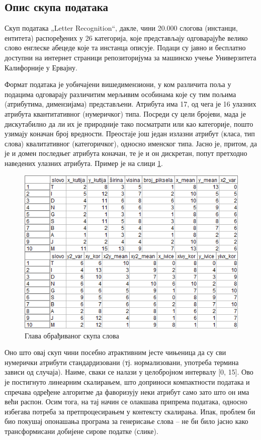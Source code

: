 \documentclass[a4paper]{article}
\begin{document}
\subsection{Опис скупа података}

Скуп података „Letter Recognition“, дакле, чини 20.000 слогова (инстанци, ентитета) распоређених у 26 категорија, које представљају одговарајуће велико слово енглеске абецеде које та инстанца описује. Подаци су јавно и бесплатно доступни на интернет страници репозиторијума за машинско учење Универзитета Калифорније у Ервајну.\cite{data}

Формат података је уобичајени вишедимензиони, у ком различита поља у подацима одговарају различитим мерљивим особинама које су тим пољима (атрибутима, димензијама) представљени. Атрибута има 17, од чега је 16 улазних атрибута квантитативног (нумеричког) типа. Посреди су цели бројеви, мада је дискутабилно да ли их је природније тако посматрати или као категорије, пошто узимају коначан број вредности. Преостаје још један излазни атрибут (класа, тип слова) квалитативног (категоричког), односно именског типа. Јасно је, притом, да је и домен последњег атрибута коначан, те је и он дискретан, попут претходно наведених улазних атрибута. Пример је на слици \ref{skup}.

\begin{figure}[h!]
\begin{center}
\includegraphics[scale=0.7]{../Slike za rad/Glava skupa.png}
\end{center}
\caption{Глава обрађиваног скупа слова}
\label{skup}
\end{figure}

Оно што овај скуп чини посебно атрактивним јесте чињеница да су сви нумерички атрибути стандардизовани (тј. нормализовани, употреба термина зависи од случаја). Наиме, сваки се налази у целобројном интервалу [0, 15]. Ово је постигнуто линеарним скалирањем, што доприноси компактности података и спречава одређене алгоритме да фаворизују неки атрибут само зато што он има већи распон. Осим тога, на тај начин се олакшава припрема података, односно избегава потреба за претпроцесирањем у контексту скалирања. Ипак, проблем би био покушај опонашања програма за генерисање слова -- не би било јасно како трансформисани добијене сирове податке (слике).
\end{document}
